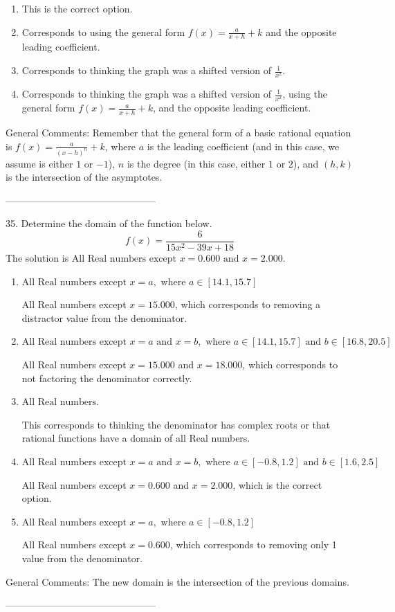 \documentclass{extbook}[14pt]
\begin{document}
\begin{enumerate}[label=\Alph*.] 
\item This is the correct option.  
\item Corresponds to using the general form $f(x) = \frac{a}{x+h}+k$ and the opposite leading coefficient.  
\item Corresponds to thinking the graph was a shifted version of $\frac{1}{x^2}$.  
\item Corresponds to thinking the graph was a shifted version of $\frac{1}{x^2}$, using the general form $f(x) = \frac{a}{x+h}+k$, and the opposite leading coefficient.  
\end{enumerate} 
 
General Comments: Remember that the general form of a basic rational equation is $ f(x) = \frac{a}{(x-h)^n} + k$, where $a$ is the leading coefficient (and in this case, we assume is either $1$ or $-1$), $n$ is the degree (in this case, either $1$ or $2$), and $(h, k)$ is the intersection of the asymptotes.

-----------------------------------------------

35. Determine the domain of the function below.
\[ f(x) = \frac{6}{15x^{2} -39 x + 18} \] 
The solution is $ \text{All Real numbers except } x = 0.600 \text{ and } x = 2.000. $ 

\begin{enumerate}[label=\Alph*.] 
\item $ \text{All Real numbers except } x = a, \text{ where } a \in [14.1, 15.7] $ 

 All Real numbers except $x = 15.000$, which corresponds to removing a distractor value from the denominator. 
\item $ \text{All Real numbers except } x = a \text{ and } x = b, \text{ where } a \in [14.1, 15.7] \text{ and } b \in [16.8, 20.5] $ 

 All Real numbers except $x = 15.000$ and $x = 18.000$, which corresponds to not factoring the denominator correctly. 
\item $ \text{All Real numbers.} $ 

 This corresponds to thinking the denominator has complex roots or that rational functions have a domain of all Real numbers. 
\item $ \text{All Real numbers except } x = a \text{ and } x = b, \text{ where } a \in [-0.8, 1.2] \text{ and } b \in [1.6, 2.5] $ 

 All Real numbers except $x = 0.600$ and $x = 2.000$, which is the correct option. 
\item $ \text{All Real numbers except } x = a, \text{ where } a \in [-0.8, 1.2] $ 

 All Real numbers except $x = 0.600$, which corresponds to removing only 1 value from the denominator. 
\end{enumerate} 
 
General Comments: The new domain is the intersection of the previous domains.

-----------------------------------------------
\end{document}
